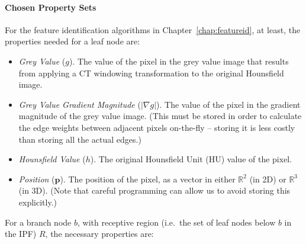 \paragraph{Chosen Property Sets}

For the feature identification algorithms in Chapter~\ref{chap:featureid}, at least, the properties needed for a leaf node are:

\begin{itemize}

\item \emph{Grey Value} ($g$). The value of the pixel in the grey value image that results from applying a CT windowing transformation to the original Hounsfield image.

\item \emph{Grey Value Gradient Magnitude} ($|\nabla g|$). The value of the pixel in the gradient magnitude of the grey value image. (This must be stored in order to calculate the edge weights between adjacent pixels on-the-fly -- storing it is less costly than storing all the actual edges.)

\item \emph{Hounsfield Value} ($h$). The original Hounsfield Unit (HU) value of the pixel.

\item \emph{Position} ($\mathbf{p}$). The position of the pixel, as a vector in either $\mathbb{R}^2$ (in 2D) or $\mathbb{R}^3$ (in 3D). (Note that careful programming can allow us to avoid storing this explicitly.)

\end{itemize}

\noindent For a branch node $b$, with receptive region (i.e.~the set of leaf nodes below $b$ in the IPF) $R$, the necessary properties are:

